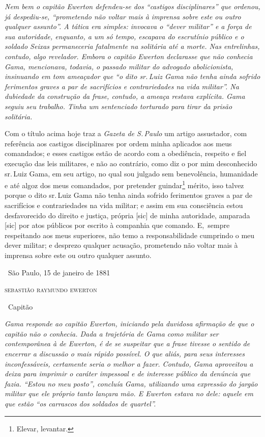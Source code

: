\begin{resumo}
\emph{Nem bem o capitão Ewerton defendeu-se dos ``castigos disciplinares''
que ordenou, já despediu-se, ``prometendo não voltar mais à imprensa
sobre este ou outro qualquer assunto''. A tática era simples: invocava o
``dever militar'' e a força de sua autoridade, enquanto, a um só tempo,
escapava do escrutínio público e o soldado Seixas permaneceria
fatalmente na solitária até a morte. Nas entrelinhas, contudo, algo
revelador. Embora o capitão Ewerton declarasse que não conhecia Gama,
mencionava, todavia, o passado militar do advogado abolicionista,
insinuando em tom ameaçador que ``o dito sr.\,Luiz Gama não tenha ainda
sofrido ferimentos graves a par de sacrifícios e contrariedades na vida
militar''. Na dubiedade da construção da frase, contudo, a ameaça restava
explícita. Gama seguiu seu trabalho. Tinha um sentenciado torturado para
tirar da prisão solitária. }
\end{resumo}

Com o título acima hoje traz a \emph{Gazeta de S.\,Paulo} um artigo
assustador, com referência aos castigos disciplinares por ordem minha
aplicados aos meus comandados; e esses castigos estão de acordo com a
obediência, respeito e fiel execução das leis militares, e não ao
contrário, como diz o por mim desconhecido sr.\,Luiz Gama, em seu artigo,
no qual sou julgado sem benevolência, humanidade e até algoz dos meus
comandados, por pretender guindar\footnote{Elevar, levantar.}
mérito, isso talvez porque
o dito sr.\,Luiz Gama não tenha ainda sofrido ferimentos graves a par de
sacrifícios e contrariedades na vida militar; e assim em sua consciência
estou desfavorecido do direito e justiça, própria {[}sic{]} de minha
autoridade, amparada {[}sic{]} por atos públicos por escrito à companhia
que comando. E,~sempre respeitando aos meus superiores, não temo a
responsabilidade cumprindo o meu dever militar; e desprezo qualquer
acusação, prometendo não voltar mais à imprensa sobre este ou outro
qualquer assunto.

\medskip
\hfill\ São Paulo, 15 de janeiro de 1881

\hfill\textsc{sebastião raymundo ewerton}

\hfill\ Capitão


\begin{resumo}
\emph{Gama responde ao capitão Ewerton, iniciando pela duvidosa
afirmação de que o capitão não o conhecia. Dada a trajetória de Gama
como militar ser contemporânea à de Ewerton, é de se suspeitar que a
frase tivesse o sentido de encerrar a discussão o mais rápido possível.
O que aliás, para seus interesses inconfessáveis, certamente seria o
melhor a fazer. Contudo, Gama aproveitou a deixa para imprimir o caráter
impessoal e de interesse público da denúncia que fazia. ``Estou no meu
posto'', concluía Gama, utilizando uma expressão do jargão militar que
ele próprio tanto lançara mão. E Ewerton estava no dele: aquele em que
estão ``os carrascos dos soldados de quartel''. }
\end{resumo}

